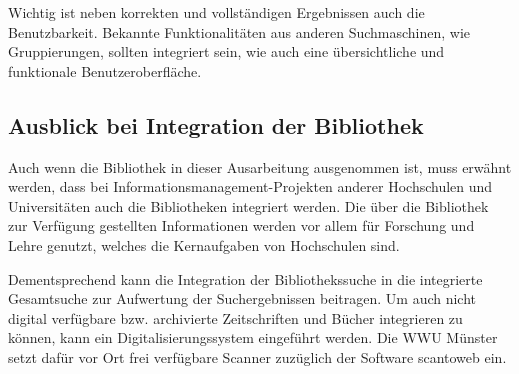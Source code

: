 Wichtig ist neben korrekten und vollständigen Ergebnissen auch die Benutzbarkeit. Bekannte Funktionalitäten aus anderen Suchmaschinen, wie Gruppierungen, sollten integriert sein, wie auch eine übersichtliche und funktionale Benutzeroberfläche.

\subsection{Ausblick bei Integration der Bibliothek}
Auch wenn die Bibliothek in dieser Ausarbeitung ausgenommen ist, muss erwähnt werden, dass bei Informationsmanagement-Projekten anderer Hochschulen und Universitäten auch die Bibliotheken integriert werden. Die über die Bibliothek zur Verfügung gestellten Informationen werden vor allem für Forschung und Lehre genutzt, welches die Kernaufgaben von Hochschulen sind.

Dementsprechend kann die Integration der Bibliothekssuche in die integrierte Gesamtsuche zur Aufwertung der Suchergebnissen beitragen. Um auch nicht digital verfügbare bzw. archivierte Zeitschriften und Bücher integrieren zu können, kann ein Digitalisierungssystem eingeführt werden. Die WWU Münster setzt dafür vor Ort frei verfügbare Scanner zuzüglich der Software scantoweb ein.
